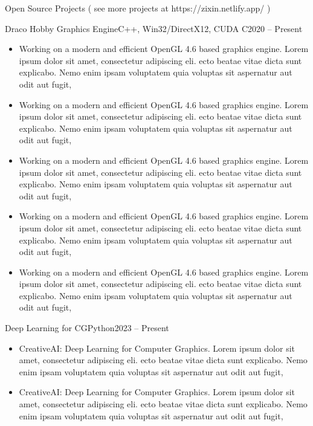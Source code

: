 \documentclass[]{mcdowellcv}
\begin{document}
	\begin{cvsection}{Open Source Projects ( see more projects at https://zixin.netlify.app/ )}
		\begin{cvsubsection}{Draco Hobby Graphics Engine}{C++, Win32/DirectX12, CUDA C}{2020 -- Present}	
			\begin{itemize}
				\item Working on a modern and efficient OpenGL 4.6 based graphics engine. Lorem ipsum dolor sit amet, consectetur adipiscing eli. ecto beatae vitae dicta sunt explicabo. Nemo enim ipsam voluptatem quia voluptas sit aspernatur aut odit aut fugit, 
				\item Working on a modern and efficient OpenGL 4.6 based graphics engine. Lorem ipsum dolor sit amet, consectetur adipiscing eli. ecto beatae vitae dicta sunt explicabo. Nemo enim ipsam voluptatem quia voluptas sit aspernatur aut odit aut fugit, 
				\item Working on a modern and efficient OpenGL 4.6 based graphics engine. Lorem ipsum dolor sit amet, consectetur adipiscing eli. ecto beatae vitae dicta sunt explicabo. Nemo enim ipsam voluptatem quia voluptas sit aspernatur aut odit aut fugit, 
				\item Working on a modern and efficient OpenGL 4.6 based graphics engine. Lorem ipsum dolor sit amet, consectetur adipiscing eli. ecto beatae vitae dicta sunt explicabo. Nemo enim ipsam voluptatem quia voluptas sit aspernatur aut odit aut fugit, 
				\item Working on a modern and efficient OpenGL 4.6 based graphics engine. Lorem ipsum dolor sit amet, consectetur adipiscing eli. ecto beatae vitae dicta sunt explicabo. Nemo enim ipsam voluptatem quia voluptas sit aspernatur aut odit aut fugit, 
			\end{itemize}
		\end{cvsubsection}
		\begin{cvsubsection}{Deep Learning for CG}{Python}{2023 -- Present}	
			\begin{itemize}
				\item CreativeAI:
				Deep Learning for
				Computer Graphics. Lorem ipsum dolor sit amet, consectetur adipiscing eli. ecto beatae vitae dicta sunt explicabo. Nemo enim ipsam voluptatem quia voluptas sit aspernatur aut odit aut fugit, 
				\item CreativeAI:
				Deep Learning for
				Computer Graphics. Lorem ipsum dolor sit amet, consectetur adipiscing eli. ecto beatae vitae dicta sunt explicabo. Nemo enim ipsam voluptatem quia voluptas sit aspernatur aut odit aut fugit, 
			\end{itemize}
		\end{cvsubsection}
	\end{cvsection}
\end{document}
